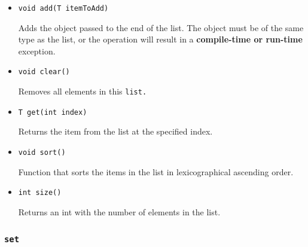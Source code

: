 \documentclass{report}
\begin{document}
\begin{itemize}

\item[] \tt void add(T itemToAdd) \rm

Adds the object passed to the end of the list. The object must be of the same
type as the list, or the operation will result in a \textbf{compile-time or
run-time} exception.

\item[] \tt void clear() \rm

Removes all elements in this \tt list\rm.

\item[] \tt T get(int index) \rm

Returns the item from the list at the specified index.


\item[] \tt void sort() \rm

Function that sorts the items in the list in lexicographical ascending order.

\item[] \tt int size() \rm

Returns an int with the number of elements in the list.

\end{itemize}



\subsubsection{\tt set \rm} %
\label{ssub:tt_set_rm}
\end{document}
